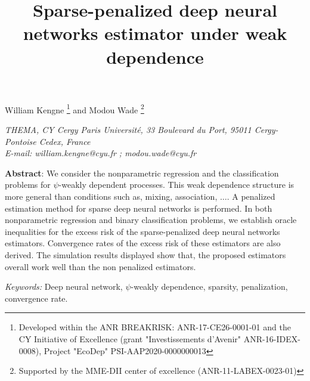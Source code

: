 \documentclass[10pt,twoside]{article}
\numberwithin{equation}{section}
\begin{document}

\title{\bf Sparse-penalized deep neural networks estimator  under weak dependence}
 \maketitle \vspace{-1.0cm}
 


\begin{center}
      William Kengne \footnote{Developed within the ANR BREAKRISK: ANR-17-CE26-0001-01 and the  CY Initiative of Excellence (grant "Investissements d'Avenir" ANR-16-IDEX-0008), Project "EcoDep" PSI-AAP2020-0000000013
   } 
   and 
     Modou Wade \footnote{Supported by the MME-DII center of excellence (ANR-11-LABEX-0023-01)} 
 \end{center}

  \begin{center}
  { \it 
 THEMA, CY Cergy Paris Université, 33 Boulevard du Port, 95011 Cergy-Pontoise Cedex, France\\
  E-mail:   william.kengne@cyu.fr  ; modou.wade@cyu.fr\\
  }
\end{center}


 \pagestyle{myheadings}




\medskip


\textbf{Abstract}:
We consider the nonparametric regression and the classification problems for $\psi$-weakly dependent processes.  
This weak dependence structure is more general than conditions such as, mixing, association, $\ldots$.
%
A penalized estimation method for sparse deep neural networks is performed.
%  
In both nonparametric regression and binary classification problems, we establish oracle inequalities for the excess risk of the sparse-penalized deep neural networks estimators.
%
Convergence rates of the excess risk of these estimators are also derived. 
%
The simulation results displayed show that, the proposed estimators overall work well than the non penalized estimators. 
 

\medskip
 
{\em Keywords:} Deep neural network, $\psi$-weakly dependence, sparsity, penalization, convergence rate.


\medskip
 
\end{document}
